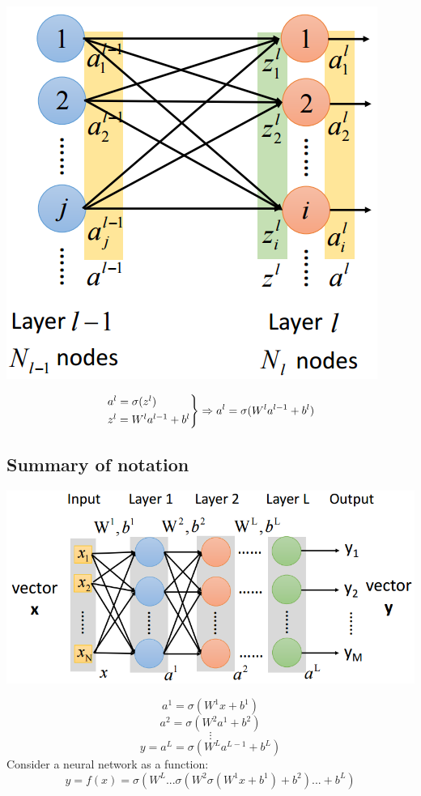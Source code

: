 \documentclass{article}
\begin{document}
\begin{center}
\includegraphics[scale=0.4]{layer_3}
\end{center}
\[
\begin{rcases*}
a^l = \sigma(z^l)\\
z^l = W^l a^{l-1} + b^l
\end{rcases*} \Rightarrow a^l=\sigma(W^la^{l-1}+b^l)
\]

\subsection{Summary of notation}
\begin{center}
\includegraphics[scale=0.4]{notation_1}
\end{center}
\[
a^1=\sigma(W^1x+b^1)
\]
\[
a^2=\sigma(W^2a^1+b^2)
\]
\[
\vdots
\]
\[
y=a^L=\sigma(W^{L}a^{L-1}+b^L)
\]
Consider a neural network as a function:
\[
y=f(x)=\sigma(W^L...\sigma(W^2\sigma(W^1x+b^1)+b^2)...+b^L)
\]
\end{document}
